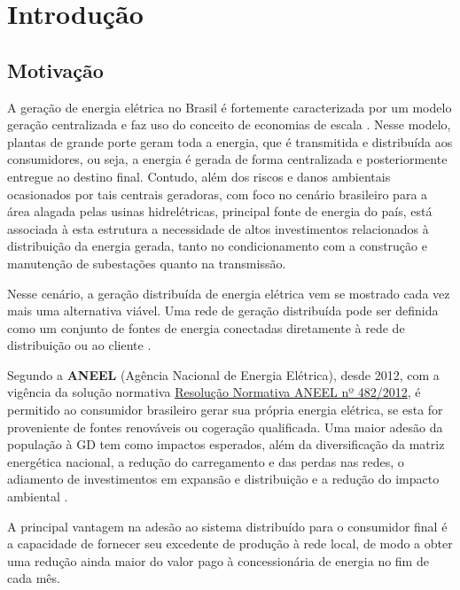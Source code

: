 \documentclass[
	12pt,				%
	openany,
	onseside,
	a4paper,			%
	english,			%
	french,				%
	spanish,			%
	brazil,				%
	]{abntex2}
\begin{document}
\chapter{Introdução}

\section{Motivação}

	A geração de energia elétrica no Brasil é fortemente caracterizada por um modelo geração centralizada e faz uso 
	do conceito de economias de escala \cite{MACHADO2016290}.
	Nesse modelo, plantas de grande porte geram toda a energia, que é transmitida e distribuída aos
	consumidores, ou seja, a energia é gerada de forma centralizada e posteriormente entregue ao destino final.
	Contudo, além dos riscos e danos ambientais ocasionados por tais centrais geradoras, com foco no cenário 
	brasileiro para a área alagada pelas usinas hidrelétricas, principal fonte de energia do país, 
	está associada à esta estrutura a necessidade de altos investimentos relacionados à distribuição da energia 
	gerada, tanto no condicionamento com a construção e manutenção de subestações quanto na transmissão.

	Nesse cenário, a geração distribuída de energia elétrica vem se mostrado cada vez mais uma alternativa viável.
	Uma rede de geração distribuída pode ser definida como um conjunto de fontes de energia conectadas diretamente 
	à rede de distribuição ou ao cliente \cite{ACKERMANN2001195}.

	Segundo a \textbf{ANEEL} (Agência Nacional de Energia Elétrica), desde 2012, com a vigência da solução normativa
	\href{http://www2.aneel.gov.br/cedoc/ren2012482.pdf}{Resolução Normativa ANEEL nº 482/2012}, é permitido ao 
	consumidor brasileiro gerar sua própria energia elétrica, se esta for proveniente de fontes renováveis ou cogeração qualificada.
	Uma maior adesão da população à GD tem como impactos esperados, além da diversificação da matriz energética nacional, 
	a redução do carregamento e das perdas nas redes, o adiamento de investimentos em expansão e distribuição e a redução 
	do impacto ambiental \cite{ANEEL_GD}.

	A principal vantagem na adesão ao sistema distribuído para o consumidor final é a capacidade de fornecer seu 
	excedente de produção à rede local, de modo a obter uma redução ainda maior do valor pago à concessionária de 
	energia no fim de cada mês.
\end{document}
